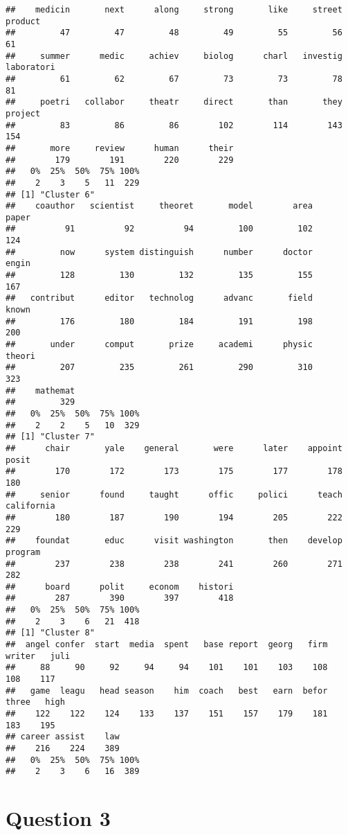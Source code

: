 \documentclass[
]{article}
\begin{document}
\begin{verbatim}
##    medicin       next      along     strong       like     street    product 
##         47         47         48         49         55         56         61 
##     summer      medic     achiev     biolog      charl   investig laboratori 
##         61         62         67         73         73         78         81 
##     poetri   collabor     theatr     direct       than       they    project 
##         83         86         86        102        114        143        154 
##       more     review      human      their 
##        179        191        220        229 
##   0%  25%  50%  75% 100% 
##    2    3    5   11  229 
## [1] "Cluster 6"
##    coauthor   scientist     theoret       model        area       paper 
##          91          92          94         100         102         124 
##         now      system distinguish      number      doctor       engin 
##         128         130         132         135         155         167 
##   contribut      editor   technolog      advanc       field       known 
##         176         180         184         191         198         200 
##       under      comput       prize     academi      physic      theori 
##         207         235         261         290         310         323 
##    mathemat 
##         329 
##   0%  25%  50%  75% 100% 
##    2    2    5   10  329 
## [1] "Cluster 7"
##      chair       yale    general       were      later    appoint      posit 
##        170        172        173        175        177        178        180 
##     senior      found     taught      offic     polici      teach california 
##        180        187        190        194        205        222        229 
##    foundat       educ      visit washington       then    develop    program 
##        237        238        238        241        260        271        282 
##      board      polit     econom    histori 
##        287        390        397        418 
##   0%  25%  50%  75% 100% 
##    2    3    6   21  418 
## [1] "Cluster 8"
##  angel confer  start  media  spent   base report  georg   firm writer   juli 
##     88     90     92     94     94    101    101    103    108    108    117 
##   game  leagu   head season    him  coach   best   earn  befor  three   high 
##    122    122    124    133    137    151    157    179    181    183    195 
## career assist    law 
##    216    224    389 
##   0%  25%  50%  75% 100% 
##    2    3    6   16  389
\end{verbatim}

\hypertarget{question-3}{%
\section{Question 3}\label{question-3}}
\end{document}
